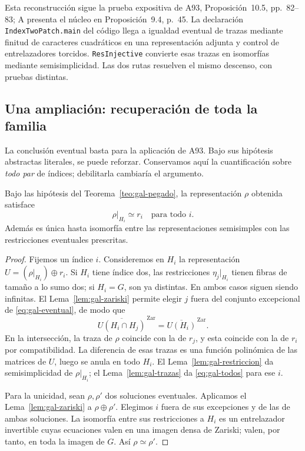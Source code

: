 Esta reconstrucción sigue la prueba expositiva de A93,
Proposición~10.5, pp.~82--83; A presenta el núcleo en
Proposición~9.4, p.~45.
La declaración \texttt{IndexTwoPatch.main} del código llega
a igualdad eventual de trazas mediante finitud de caracteres
cuadráticos en una representación adjunta y control de
entrelazadores torcidos.
\texttt{ResInjective} convierte esas trazas en isomorfías
mediante semisimplicidad.
Las dos rutas resuelven el mismo descenso, con pruebas distintas.

\subsection{Una ampliación: recuperación de toda la familia}
\label{subsec:gal-todos}

La conclusión eventual basta para la aplicación de A93.
Bajo sus hipótesis abstractas literales, se puede reforzar.
Conservamos aquí la cuantificación sobre \emph{todo par}
de índices; debilitarla cambiaría el argumento.

\begin{proposicion}
\label{prop:gal-todos}
Bajo las hipótesis del Teorema~\ref{teo:gal-pegado},
la representación $\rho$ obtenida satisface
\begin{equation}
 \rho|_{H_i}\simeq r_i
                \quad\text{para todo }i.
 \label{eq:gal-todos}
\end{equation}
Además es única hasta isomorfía entre las representaciones
semisimples con las restricciones eventuales prescritas.
\end{proposicion}

\begin{proof}
Fijemos un índice $i$. Consideremos en $H_i$ la representación
$U=(\rho|_{H_i})\oplus r_i$.
Si $H_i$ tiene índice dos, las restricciones $\eta_j|_{H_i}$
tienen fibras de tamaño a lo sumo dos; si $H_i=G$, son ya
distintas. En ambos casos siguen siendo infinitas.
El Lema~\ref{lem:gal-zariski} permite elegir $j$ fuera del
conjunto excepcional de \eqref{eq:gal-eventual}, de modo que
\[
 \overline{U(H_i\cap H_j)}^{\,\mathrm{Zar}}
       =\overline{U(H_i)}^{\,\mathrm{Zar}}.
\]
En la intersección, la traza de $\rho$ coincide con la de $r_j$,
y esta coincide con la de $r_i$ por compatibilidad.
La diferencia de esas trazas es una función polinómica de las
matrices de $U$, luego se anula en todo $H_i$.
El Lema~\ref{lem:gal-restriccion} da semisimplicidad de
$\rho|_{H_i}$; el Lema~\ref{lem:gal-trazas} da
\eqref{eq:gal-todos} para ese $i$.

Para la unicidad, sean $\rho,\rho'$ dos soluciones eventuales.
Aplicamos el Lema~\ref{lem:gal-zariski} a $\rho\oplus\rho'$.
Elegimos $i$ fuera de sus excepciones y de las de ambas
soluciones. La isomorfía entre sus restricciones a $H_i$
es un entrelazador invertible cuyas ecuaciones valen en una
imagen densa de Zariski; valen, por tanto, en toda la imagen
de $G$. Así $\rho\simeq\rho'$.
\end{proof}

